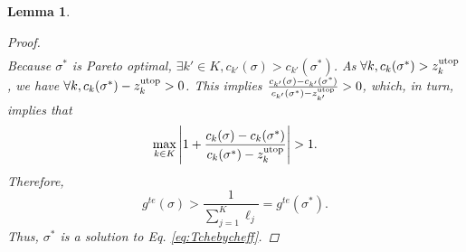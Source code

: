 \documentclass{article}
\newtheorem{lem}{Lemma}
\begin{document}
\begin{lem}
\begin{proof}
\begin{eqnarray*}
\end{eqnarray*}
%
Because $ \sigma^{*} $ is Pareto optimal,
$\exists k' \in K, c_{k'} ( \sigma ) >  c_{k'} ( \sigma^{*} )$.
As $ \forall k,  c_{k}( \sigma^{*} ) > z^{\rm utop}_{k} $,
we have $ \forall k,  c_{k}( \sigma^{*} ) - z^{\rm utop}_{k} > 0 $.
This implies
$\frac{ c_{k'}( \sigma ) - c_{k'} ( \sigma^{*} )  }{  c_{k'} ( \sigma^{*} ) - z^{\rm utop}_{k'} }  > 0$,
which, in turn, implies that
\begin{equation}
\max_{k \in K} \left| 1 + \frac{ c_{k}( \sigma ) - c_{k} ( \sigma^{*} )  }{  c_{k} ( \sigma^{*} ) - z^{\rm utop}_{k} } \right| > 1.
\end{equation}
Therefore,
\begin{equation}
g^{te} ( \sigma ) >  \frac{1}{\sum_{j=1}^K \ell_j} = g^{te} ( \sigma^{*} ).
\end{equation}
Thus, $  \sigma^{*} $ is a solution to Eq. \eqref{eq:Tchebycheff}.

\end{proof}
\end{lem}
\end{document}
